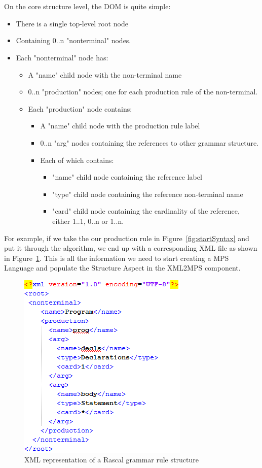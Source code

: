 \documentclass[a4paper]{article}
\begin{document}
\\\\
On the core structure level, the DOM is quite simple:
\begin{itemize}
	\item There is a single top-level root node
	\item Containing 0..n "nonterminal" nodes.
	\item Each "nonterminal" node has:
	\begin{itemize}
		\item A "name" child node with the non-terminal name
		\item 0..n "production" nodes; one for each production rule of the non-terminal.
		\item Each "production" node contains:
		\begin{itemize}
			\item  A "name" child node with the production rule label
			\item 0..n "arg" nodes containing the references to other grammar structure.
			\item Each of which contains:
			\begin{itemize}
				\item "name" child node containing the reference label
				\item "type" child node containing the reference non-terminal name
				\item "card" child node containing the cardinality of the reference, either 1..1, 0..n or 1..n.
			\end{itemize}
		\end{itemize}
	\end{itemize}
\end{itemize}

For example, if we take the our production rule in Figure~\ref{fig:startSyntax} and put it through the algorithm, we end up with a corresponding XML file as shown in Figure~\ref{fig:XML}. This is all the information we need to start creating a MPS Language and populate the Structure Aspect in the XML2MPS component.

\begin{figure}[h]
	\centering
	\includegraphics[scale=0.7]{images/StartSyntaxXML.png}
	\caption{XML representation of a Rascal grammar rule structure}
	\label{fig:XML}
\end{figure}
\end{document}
